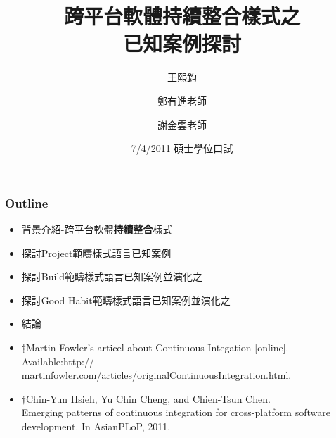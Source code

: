 \documentclass[utf8x]{beamer}
\begin{document}
 
\date[7/4/2011]{7/4/2011 碩士學位口試} 
\title[跨平台軟體持續整合樣式之已知案例探討]{跨平台軟體持續整合樣式之\\已知案例探討} 
\author[王熙鈞] 
        { 王熙鈞\inst{\dag} \and 鄭有進老師\inst{\ddag} \and 謝金雲老師\inst{\ddag} } 




\begin{frame}%
    \titlepage\end{frame} 


\begin{frame}%

\frametitle{Outline} 

\begin{itemize}
\setlength{\itemindent}{1em}
\item 背景介紹\hspace{3pt}-\hspace{3pt}跨平台軟體\hspace{2pt}\textbf{持續整合}\ddag\hspace{2pt}樣式\dag
\item 探討Project範疇樣式語言已知案例%
\item 探討Build範疇樣式語言已知案例並演化之%
\item 探討Good Habit範疇樣式語言已知案例並演化之
\item 結論%
\fontsize{6pt}{4pt}\selectfont
\item[] $\ddag$Martin Fowler's articel about Continuous Integation [online]. Available:http:// martinfowler.com/articles/originalContinuousIntegration.html.
\item[] $\dag$Chin-Yun Hsieh, Yu Chin Cheng, and Chien-Tsun Chen. \\Emerging patterns of continuous integration for cross-platform software development. In AsianPLoP, 2011.
\end{itemize}
\end{frame} 
 
\end{document}
